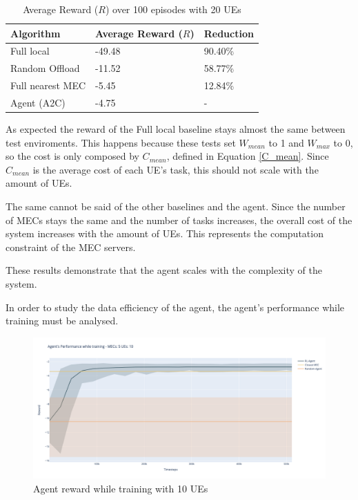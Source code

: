 \begin{table}[H]
\centering
\begin{tabular}{|l|l|l|}
\hline
Algorithm        & Average Reward ($R$) & Reduction\\ \hline
Full local       & -49.48 & 90.40\%\\
Random Offload   & -11.52 & 58.77\%\\
Full nearest MEC & -5.45 & 12.84\%\\ 
Agent (A2C) & -4.75 & -\\ \hline
\end{tabular}
\caption{Average Reward ($R$) over 100 episodes with 20 \acrshort{UE}s} \label{results_5_20}
\end{table}

As expected the reward of the Full local baseline stays almost the same between test enviroments. This happens because these tests set $W_{mean}$ to 1 and $W_{max}$ to 0, so the cost is only composed by $C_{mean}$, defined in Equation \ref{C_mean}. Since $C_{mean}$ is the average cost of each \acrshort{UE}'s task, this should not scale with the amount of \acrshort{UE}s.

The same cannot be said of the other baselines and the agent. Since the number of \acrshort{MEC}s stays the same and the number of tasks increases, the overall cost of the system increases with the amount of \acrshort{UE}s. This represents the computation constraint of the \acrshort{MEC} servers. 

These results demonstrate that the agent scales with the complexity of the system.

In order to study the data efficiency of the agent, the agent's performance while training must be analysed.


\begin{figure}[H]
  \centering
  \includegraphics[width=\textwidth]{images/5_10_training.png}
  \caption{Agent reward while training with 10 \acrshort{UE}s}  \label{5_10_training}
\end{figure}

